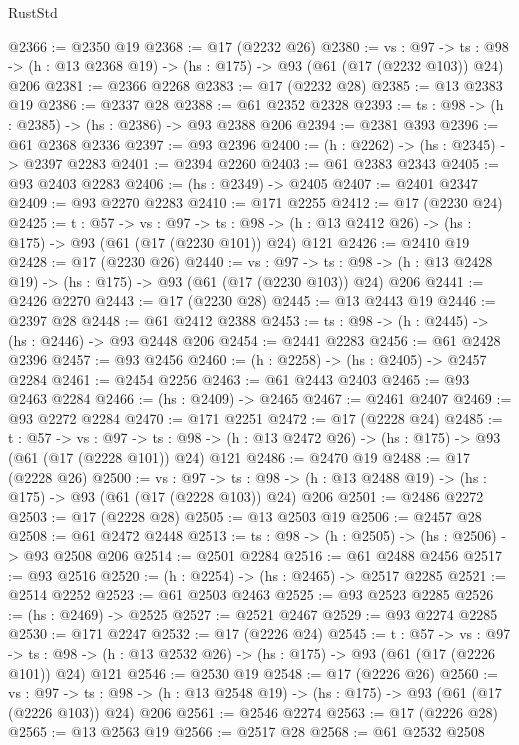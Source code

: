 \begin{lexlean}{RustStd}
\begin{coremodule}
@2366 := @2350 @19
@2368 := @17 (@2232 @26)
@2380 := {vs : @97} ->
  {ts : @98} -> (h : @13 @2368 @19) -> (hs : @175) -> @93 (@61 (@17 (@2232 @103)) @24) @206
@2381 := @2366 @2268
@2383 := @17 (@2232 @28)
@2385 := @13 @2383 @19
@2386 := @2337 @28
@2388 := @61 @2352 @2328
@2393 := {ts : @98} -> (h : @2385) -> (hs : @2386) -> @93 @2388 @206
@2394 := @2381 @393
@2396 := @61 @2368 @2336
@2397 := @93 @2396
@2400 := (h : @2262) -> (hs : @2345) -> @2397 @2283
@2401 := @2394 @2260
@2403 := @61 @2383 @2343
@2405 := @93 @2403 @2283
@2406 := (hs : @2349) -> @2405
@2407 := @2401 @2347
@2409 := @93 @2270 @2283
@2410 := @171 @2255
@2412 := @17 (@2230 @24)
@2425 := {t : @57} ->
  {vs : @97} ->
  {ts : @98} -> (h : @13 @2412 @26) -> (hs : @175) -> @93 (@61 (@17 (@2230 @101)) @24) @121
@2426 := @2410 @19
@2428 := @17 (@2230 @26)
@2440 := {vs : @97} ->
  {ts : @98} -> (h : @13 @2428 @19) -> (hs : @175) -> @93 (@61 (@17 (@2230 @103)) @24) @206
@2441 := @2426 @2270
@2443 := @17 (@2230 @28)
@2445 := @13 @2443 @19
@2446 := @2397 @28
@2448 := @61 @2412 @2388
@2453 := {ts : @98} -> (h : @2445) -> (hs : @2446) -> @93 @2448 @206
@2454 := @2441 @2283
@2456 := @61 @2428 @2396
@2457 := @93 @2456
@2460 := (h : @2258) -> (hs : @2405) -> @2457 @2284
@2461 := @2454 @2256
@2463 := @61 @2443 @2403
@2465 := @93 @2463 @2284
@2466 := (hs : @2409) -> @2465
@2467 := @2461 @2407
@2469 := @93 @2272 @2284
@2470 := @171 @2251
@2472 := @17 (@2228 @24)
@2485 := {t : @57} ->
  {vs : @97} ->
  {ts : @98} -> (h : @13 @2472 @26) -> (hs : @175) -> @93 (@61 (@17 (@2228 @101)) @24) @121
@2486 := @2470 @19
@2488 := @17 (@2228 @26)
@2500 := {vs : @97} ->
  {ts : @98} -> (h : @13 @2488 @19) -> (hs : @175) -> @93 (@61 (@17 (@2228 @103)) @24) @206
@2501 := @2486 @2272
@2503 := @17 (@2228 @28)
@2505 := @13 @2503 @19
@2506 := @2457 @28
@2508 := @61 @2472 @2448
@2513 := {ts : @98} -> (h : @2505) -> (hs : @2506) -> @93 @2508 @206
@2514 := @2501 @2284
@2516 := @61 @2488 @2456
@2517 := @93 @2516
@2520 := (h : @2254) -> (hs : @2465) -> @2517 @2285
@2521 := @2514 @2252
@2523 := @61 @2503 @2463
@2525 := @93 @2523 @2285
@2526 := (hs : @2469) -> @2525
@2527 := @2521 @2467
@2529 := @93 @2274 @2285
@2530 := @171 @2247
@2532 := @17 (@2226 @24)
@2545 := {t : @57} ->
  {vs : @97} ->
  {ts : @98} -> (h : @13 @2532 @26) -> (hs : @175) -> @93 (@61 (@17 (@2226 @101)) @24) @121
@2546 := @2530 @19
@2548 := @17 (@2226 @26)
@2560 := {vs : @97} ->
  {ts : @98} -> (h : @13 @2548 @19) -> (hs : @175) -> @93 (@61 (@17 (@2226 @103)) @24) @206
@2561 := @2546 @2274
@2563 := @17 (@2226 @28)
@2565 := @13 @2563 @19
@2566 := @2517 @28
@2568 := @61 @2532 @2508

\end{coremodule}
\end{lexlean}
